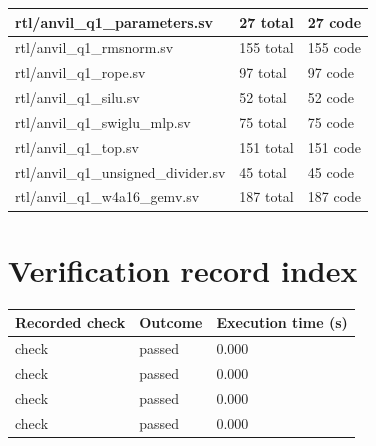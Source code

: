 \documentclass[11pt,a4paper]{article}
\begin{document}
{\begin{longtable}{@{}L{0.55\textwidth}|L{0.18\textwidth}|L{0.18\textwidth}@{}}
rtl/\allowbreak{}anvil\_\allowbreak{}q1\_\allowbreak{}parameters.sv & 27 total & 27 code\\[2pt]\hline

rtl/\allowbreak{}anvil\_\allowbreak{}q1\_\allowbreak{}rmsnorm.sv & 155 total & 155 code\\[2pt]\hline

rtl/\allowbreak{}anvil\_\allowbreak{}q1\_\allowbreak{}rope.sv & 97 total & 97 code\\[2pt]\hline

rtl/\allowbreak{}anvil\_\allowbreak{}q1\_\allowbreak{}silu.sv & 52 total & 52 code\\[2pt]\hline

rtl/\allowbreak{}anvil\_\allowbreak{}q1\_\allowbreak{}swiglu\_\allowbreak{}mlp.sv & 75 total & 75 code\\[2pt]\hline

rtl/\allowbreak{}anvil\_\allowbreak{}q1\_\allowbreak{}top.sv & 151 total & 151 code\\[2pt]\hline

rtl/\allowbreak{}anvil\_\allowbreak{}q1\_\allowbreak{}unsigned\_\allowbreak{}divider.sv & 45 total & 45 code\\[2pt]\hline

rtl/\allowbreak{}anvil\_\allowbreak{}q1\_\allowbreak{}w4a16\_\allowbreak{}gemv.sv & 187 total & 187 code\\[2pt]\hline

\bottomrule\end{longtable}}

\section{Verification record index}

{\small\renewcommand{\arraystretch}{1.18}\begin{longtable}{@{}L{0.57\textwidth}|L{0.16\textwidth}|L{0.17\textwidth}@{}}\toprule

\textbf{Recorded check} & \textbf{Outcome} & \textbf{Execution time (\allowbreak{}s)\allowbreak{}}\\\midrule\endhead

check & passed & 0.000\\[2pt]\hline

check & passed & 0.000\\[2pt]\hline

check & passed & 0.000\\[2pt]\hline

check & passed & 0.000\\[2pt]\hline

\bottomrule\end{longtable}}
\end{document}
